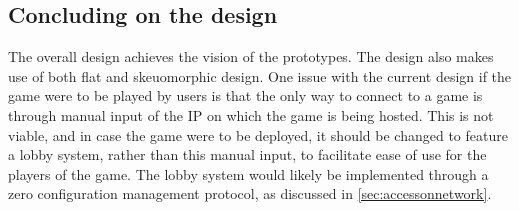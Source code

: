 \subsection{Concluding on the design}
The overall design achieves the vision of the prototypes.
The design also makes use of both flat and skeuomorphic design.
One issue with the current design if the game were to be played by users is that the only way to connect to a game is through manual input of the IP on which the game is being hosted.
This is not viable, and in case the game were to be deployed, it should be changed to feature a lobby system, rather than this manual input, to facilitate ease of use for the players of the game.
The lobby system would likely be implemented through a zero configuration management protocol, as discussed in \autoref{sec:accessonnetwork}.